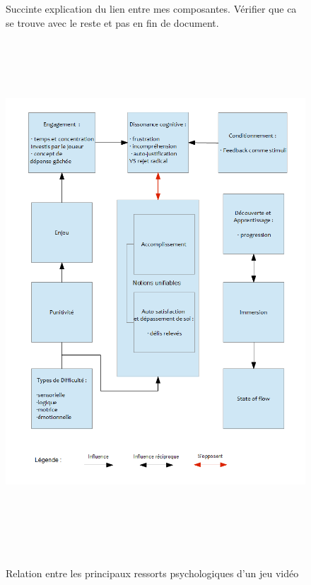 \begin{figure}
Succinte explication du lien entre mes composantes. Vérifier que ca se trouve avec le reste et pas en fin de document.
	\centering
	\includegraphics[height=19.6cm]{images/lien_theories}
	\caption{Relation entre les principaux ressorts psychologiques d'un jeu vidéo}
	\label{lien_theories}
\end{figure}